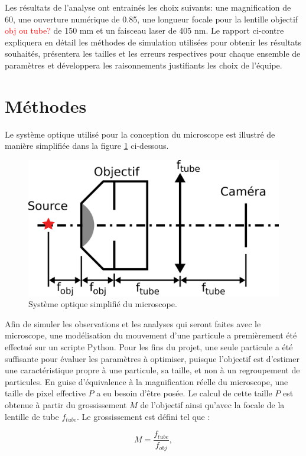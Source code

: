 \documentclass[conference]{IEEEtran}
\begin{document}
Les résultats de l'analyse ont entrainés les choix suivants: une magnification de 60, une ouverture numérique de 0.85, une longueur focale pour la lentille objectif \textcolor{red}{obj ou tube?}
de 150 mm et un faisceau laser de 405 nm. Le rapport ci-contre expliquera en détail les méthodes de simulation utilisées pour obtenir 
les résultats souhaités, présentera les tailles et les erreurs respectives pour chaque ensemble de paramètres et développera les raisonnements
justifiants les choix de l'équipe.


\section{Méthodes \label{methodes}}
Le système optique utilisé pour la conception du microscope est illustré de manière simplifiée
dans la figure \ref{sys} ci-dessous.
\begin{figure}[H]
  \centering
  \includegraphics[scale=2.3]{systeme.png}
  \caption{Système optique simplifié du microscope.}
  \label{sys}
\end{figure}
Afin de simuler les observations et les analyses qui seront faites avec le microscope,
une modélisation du mouvement d'une particule a premièrement été effectué sur un scripte Python.
Pour les fins du projet, une seule particule a été suffisante pour
évaluer les paramètres à optimiser, puisque l'objectif est d'estimer une caractéristique propre 
à une particule, sa taille, et non à un regroupement de particules. En guise d'équivalence à la magnification réelle du microscope, 
une taille de pixel effective $P$ a eu besoin d'être posée. Le calcul de cette taille $P$ est obtenue à partir du grossissement $M$ de l'objectif ainsi qu'avec la
focale de la lentille de tube $f_{tube}$. Le grossissement est défini tel que :

\begin{equation}\label{m_1}
  M = \frac{f_{tube}}{f_{obj}},
\end{equation}
\end{document}
